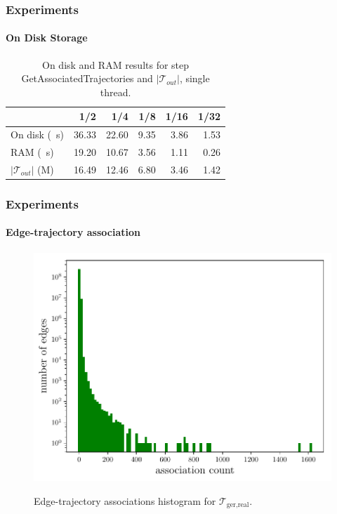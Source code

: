 \documentclass{beamer}
\newcommand{\getAssociatedTrajectories}{GetAssociatedTrajectories\xspace}
\newcommand{\traj}[2]{\mathcal{T}_{\text{#1},\text{#2}}}
\begin{document}
\begin{frame}
	\frametitle{Experiments}
	\framesubtitle{On Disk Storage}
	\begin{table}
		{
			\caption{On disk and RAM results for step \getAssociatedTrajectories and $|\mathcal{T}_{out}|$, single thread.}
			\begin{tabular}{|l||r|r|r|r|r|}
				\hline
				                          & 1/2   & 1/4   & 1/8  & 1/16 & 1/32 \\
				\hline
				On disk (\SI{}{s})        & 36.33 & 22.60 & 9.35 & 3.86 & 1.53 \\
				RAM (\SI{}{s})            & 19.20 & 10.67 & 3.56 & 1.11 & 0.26 \\
				$|\mathcal{T}_{out}|$ (M) & 16.49 & 12.46 & 6.80 & 3.46 & 1.42 \\
				\hline
			\end{tabular}
		}
	\end{table}
\end{frame}

\begin{frame}
	\frametitle{Experiments}
	\framesubtitle{Edge-trajectory association}
	\begin{figure}
		{\includegraphics[width=.4\linewidth]{plots/osmGerHist.pdf} }
		\caption{Edge-trajectory associations histogram  for $\traj{ger}{real}$.}
	\end{figure}
\end{frame}

\end{document}
